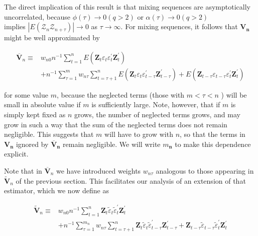 \documentclass[10pt]{article}
\begin{document}
The direct implication of this result is that mixing sequences are asymptotically uncorrelated, because $\phi(\tau) \rightarrow 0(q>2)$ or $\alpha(\tau) \rightarrow 0(q>2)$\\
implies $\left|E\left(\mathcal{Z}_{n} \mathcal{Z}_{n+\tau}\right)\right| \rightarrow 0$ as $\tau \rightarrow \infty$. For mixing sequences, it follows that $\mathbf{V}_{\boldsymbol{n}}$ might be well approximated by

$$
\begin{aligned}
\overline{\mathbf{V}}_{n} \equiv & w_{n 0} n^{-1} \sum_{t=1}^{n} E\left(\mathbf{Z}_{t} \varepsilon_{t} \varepsilon_{t}^{\prime} \mathbf{Z}_{t}^{\prime}\right) \\
& +n^{-1} \sum_{\tau=1}^{m} w_{n \tau} \sum_{t=\tau+1}^{n} E\left(\mathbf{Z}_{t} \varepsilon_{t} \varepsilon_{t-\tau}^{\prime} \mathbf{Z}_{t-\tau}^{\prime}\right)+E\left(\mathbf{Z}_{t-\tau} \varepsilon_{t-\tau} \varepsilon_{t}^{\prime} \mathbf{Z}_{t}^{\prime}\right)
\end{aligned}
$$

for some value $m$, because the neglected terms (those with $m<\tau<n$ ) will be small in absolute value if $m$ is sufficiently large. Note, however, that if $m$ is simply kept fixed as $n$ grows, the number of neglected terms grows, and may grow in such a way that the sum of the neglected terms does not remain negligible. This suggests that $m$ will have to grow with $n$, so that the terms in $\mathbf{V}_{\boldsymbol{n}}$ ignored by $\overline{\mathbf{V}}_{\boldsymbol{n}}$ remain negligible. We will write $m_{\boldsymbol{n}}$ to make this dependence explicit.

Note that in $\overline{\mathbf{V}}_{n}$ we have introduced weights $w_{n \tau}$ analogous to those appearing in $\tilde{\mathbf{V}}_{n}$ of the previous section. This facilitates our analysis of an extension of that estimator, which we now define as

$$
\begin{aligned}
\tilde{\mathbf{V}}_{n} \equiv & w_{n 0} n^{-1} \sum_{t=1}^{n} \mathbf{Z}_{t} \tilde{\varepsilon}_{t} \tilde{\varepsilon}_{t}^{\prime} \mathbf{Z}_{t}^{\prime} \\
& +n^{-1} \sum_{\tau=1}^{m_{n}} w_{n \tau} \sum_{t=\tau+1}^{n} \mathbf{Z}_{t} \tilde{\varepsilon}_{t} \tilde{\varepsilon}_{t-\tau}^{\prime} \mathbf{Z}_{t-\tau}^{\prime}+\mathbf{Z}_{t-\tau} \tilde{\varepsilon}_{t-\tau} \tilde{\varepsilon}_{t}^{\prime} \mathbf{Z}_{t}^{\prime}
\end{aligned}
$$
\end{document}
